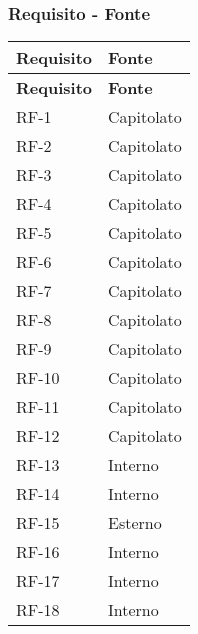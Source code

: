 \subsubsection{Requisito - Fonte}
\begin{longtable}{|>{\centering\arraybackslash}m{}|>{\centering\arraybackslash}m{}|}
	\hline
	\textbf{Requisito} & \textbf{Fonte}                 \\\hline
	\endfirsthead
	\hline
	\textbf{Requisito} & \textbf{Fonte}                 \\\hline
	\endhead
	RF-1               & Capitolato                     \\\hline
	RF-2               & Capitolato                     \\\hline
	RF-3               & Capitolato                     \\\hline
	RF-4               & Capitolato                     \\\hline
	RF-5               & Capitolato                     \\\hline
	RF-6               & Capitolato                     \\\hline
	RF-7               & Capitolato                     \\\hline
	RF-8               & Capitolato                     \\\hline
	RF-9               & Capitolato                     \\\hline
	RF-10              & Capitolato                     \\\hline
	RF-11              & Capitolato                     \\\hline
	RF-12              & Capitolato                     \\\hline
	RF-13              & Interno                        \\\hline
	RF-14              & Interno                        \\\hline
	RF-15              & Esterno                        \\\hline
	RF-16              & Interno                        \\\hline
	RF-17              & Interno                        \\\hline
	RF-18              & Interno                        \\\hline

\end{longtable}
